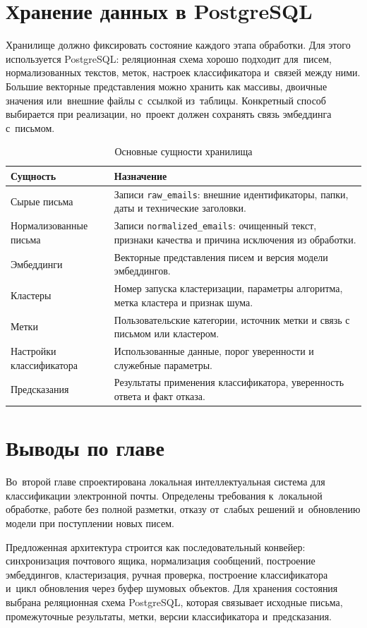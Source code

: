 \section{Хранение данных в PostgreSQL}\label{sec:ch2/storage}

Хранилище должно фиксировать состояние каждого этапа обработки. Для этого
используется PostgreSQL: реляционная схема хорошо подходит для~писем,
нормализованных текстов, меток, настроек классификатора и~связей между ними.
Большие векторные представления можно хранить как массивы, двоичные значения
или~внешние файлы с~ссылкой из~таблицы. Конкретный способ выбирается при
реализации, но~проект должен сохранять связь эмбеддинга с~письмом.

\begin{table}[htbp]
    \centering
    \caption{Основные сущности хранилища}\label{tab:ch2/storage}
    \begin{tabular}{@{}p{}p{}@{}}
        \toprule
        Сущность & Назначение \\
        \midrule
        Сырые письма & Записи \texttt{raw\_emails}: внешние идентификаторы,
        папки, даты и технические заголовки. \\
        Нормализованные письма & Записи \texttt{normalized\_emails}: очищенный
        текст, признаки качества и причина исключения из обработки. \\
        Эмбеддинги & Векторные представления писем и версия модели эмбеддингов. \\
        Кластеры & Номер запуска кластеризации, параметры алгоритма, метка
        кластера и признак шума. \\
        Метки & Пользовательские категории, источник метки и связь с письмом
        или кластером. \\
        Настройки классификатора & Использованные данные, порог уверенности и
        служебные параметры. \\
        Предсказания & Результаты применения классификатора, уверенность ответа
        и факт отказа. \\
        \bottomrule
    \end{tabular}
\end{table}
\FloatBarrier

\section{Выводы по главе}\label{sec:ch2/concl}

Во~второй главе спроектирована локальная интеллектуальная система для
классификации электронной почты. Определены требования к~локальной обработке,
работе без полной разметки, отказу от~слабых решений и~обновлению модели при
поступлении новых писем.

Предложенная архитектура строится как последовательный конвейер: синхронизация
почтового ящика, нормализация сообщений, построение эмбеддингов, кластеризация,
ручная проверка, построение классификатора и~цикл обновления через буфер
шумовых объектов. Для хранения состояния выбрана реляционная схема PostgreSQL,
которая связывает исходные письма, промежуточные результаты, метки, версии
классификатора и~предсказания.

